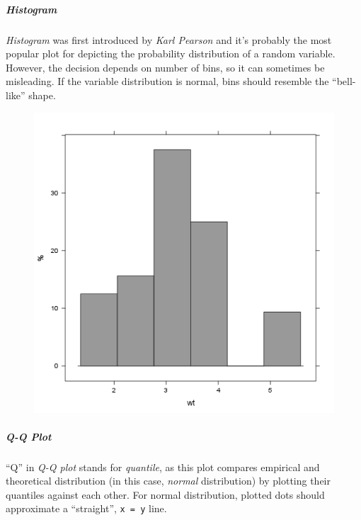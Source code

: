 \documentclass[]{article}
\makeatletter
\def\maxwidth{\ifdim\Gin@nat@width>\linewidth\linewidth
\else\Gin@nat@width\fi}
\let\Oldincludegraphics\includegraphics
\renewcommand{\includegraphics}[1]{\Oldincludegraphics[width=\maxwidth]{#1}}
\makeatother
\begin{document}
\subparagraph{Histogram}

\emph{Histogram} was first introduced by \emph{Karl Pearson} and it's
probably the most popular plot for depicting the probability
distribution of a random variable. However, the decision depends on
number of bins, so it can sometimes be misleading. If the variable
distribution is normal, bins should resemble the ``bell-like'' shape.

\begin{figure}[htbp]
\centering
\includegraphics{10caa8222b28328a6d8fd28917cbfb45.png}
\caption{}
\end{figure}

\subparagraph{Q-Q Plot}

``Q'' in \emph{Q-Q plot} stands for \emph{quantile}, as this plot
compares empirical and theoretical distribution (in this case,
\emph{normal} distribution) by plotting their quantiles against each
other. For normal distribution, plotted dots should approximate a
``straight'', \texttt{x = y} line.
\end{document}
